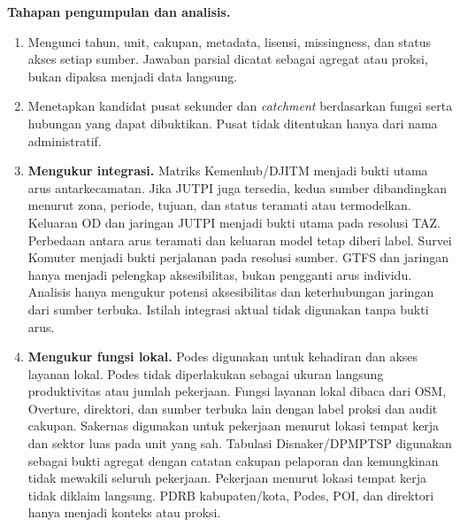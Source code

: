 \documentclass[11pt]{article}
\begin{document}
{{{{{{            \textbf{Tahapan pengumpulan dan analisis.}\par\medskip
            \begin{enumerate}
              \item Mengunci tahun, unit, cakupan, metadata, lisensi, missingness, dan status akses setiap sumber. Jawaban parsial dicatat sebagai agregat atau proksi, bukan dipaksa menjadi data langsung.
              \item Menetapkan kandidat pusat sekunder dan \textit{catchment} berdasarkan fungsi serta hubungan yang dapat dibuktikan. Pusat tidak ditentukan hanya dari nama administratif.
              \item \textbf{Mengukur integrasi.}
              \ifnum{}
                Matriks Kemenhub/DJITM menjadi bukti utama arus antarkecamatan. Jika JUTPI juga tersedia, kedua sumber dibandingkan menurut zona, periode, tujuan, dan status teramati atau termodelkan.
              \else
                \ifnum{}
                  Keluaran OD dan jaringan JUTPI menjadi bukti utama pada resolusi TAZ. Perbedaan antara arus teramati dan keluaran model tetap diberi label.
                \else
                  \ifnum{}
                    Survei Komuter menjadi bukti perjalanan pada resolusi sumber. GTFS dan jaringan hanya menjadi pelengkap aksesibilitas, bukan pengganti arus individu.
                  \else
                    Analisis hanya mengukur potensi aksesibilitas dan keterhubungan jaringan dari sumber terbuka. Istilah integrasi aktual tidak digunakan tanpa bukti arus.
                  \fi
                \fi
              \fi
              \item \textbf{Mengukur fungsi lokal.}
              \ifnum{}
                Podes digunakan untuk kehadiran dan akses layanan lokal. Podes tidak diperlakukan sebagai ukuran langsung produktivitas atau jumlah pekerjaan.
              \else
                Fungsi layanan lokal dibaca dari OSM, Overture, direktori, dan sumber terbuka lain dengan label proksi dan audit cakupan.
              \fi
              \ifnum{}
                Sakernas digunakan untuk pekerjaan menurut lokasi tempat kerja dan sektor luas pada unit yang sah.
              \else
                \ifnum{}
                  Tabulasi Disnaker/DPMPTSP digunakan sebagai bukti agregat dengan catatan cakupan pelaporan dan kemungkinan tidak mewakili seluruh pekerjaan.
                \else
                  Pekerjaan menurut lokasi tempat kerja tidak diklaim langsung. PDRB kabupaten/kota, Podes, POI, dan direktori hanya menjadi konteks atau proksi.

\end{enumerate}}}}}}}
\end{document}
